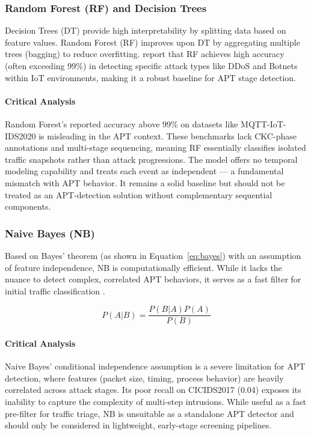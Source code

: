 \subsubsection{Random Forest (RF) and Decision Trees}
Decision Trees (DT) provide high interpretability by splitting data based on feature values. Random Forest (RF) improves upon DT by aggregating multiple trees (bagging) to reduce overfitting. \cite{ankalaki2025cyber} report that RF achieves high accuracy (often exceeding 99\%) in detecting specific attack types like DDoS and Botnets within IoT environments, making it a robust baseline for APT stage detection.

\paragraph{Critical Analysis}
Random Forest's reported accuracy above 99\% on datasets like MQTT-IoT-IDS2020 is misleading in the APT context. These benchmarks lack CKC-phase annotations and multi-stage sequencing, meaning RF essentially classifies isolated traffic snapshots rather than attack progressions. The model offers no temporal modeling capability and treats each event as independent — a fundamental mismatch with APT behavior. It remains a solid baseline but should not be treated as an APT-detection solution without complementary sequential components.

\subsubsection{Naive Bayes (NB)}
Based on Bayes' theorem (as shown in Equation~\ref{eq:bayes}) with an assumption of feature independence, NB is computationally efficient. While it lacks the nuance to detect complex, correlated APT behaviors, it serves as a fast filter for initial traffic classification \cite{ankalaki2025cyber}.

\begin{equation}
    P(A|B) = \frac{P(B|A) P(A)}{P(B)}
    \label{eq:bayes}
\end{equation}

\paragraph{Critical Analysis}
Naive Bayes' conditional independence assumption is a severe limitation for APT detection, where features (packet size, timing, process behavior) are heavily correlated across attack stages. Its poor recall on CICIDS2017 (0.04) exposes its inability to capture the complexity of multi-step intrusions. While useful as a fast pre-filter for traffic triage, NB is unsuitable as a standalone APT detector and should only be considered in lightweight, early-stage screening pipelines.


